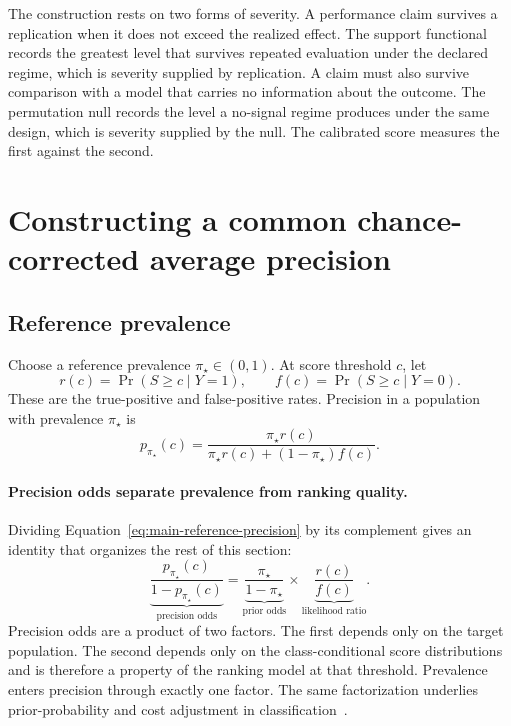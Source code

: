 \documentclass[11pt]{article}
\theoremstyle{remark}
\begin{document}
The construction rests on two forms of severity. A performance claim survives a replication when it does not exceed the realized effect. The support functional records the greatest level that survives repeated evaluation under the declared regime, which is severity supplied by replication. A claim must also survive comparison with a model that carries no information about the outcome. The permutation null records the level a no-signal regime produces under the same design, which is severity supplied by the null. The calibrated score measures the first against the second.

\section{Constructing a common chance-corrected average precision}

\subsection{Reference prevalence}

Choose a reference prevalence $\pi_\star\in(0,1)$. At score threshold $c$, let
\[
r(c)=\Pr(S\geq c\mid Y=1),
\qquad
f(c)=\Pr(S\geq c\mid Y=0).
\]
These are the true-positive and false-positive rates. Precision in a population with prevalence $\pi_\star$ is
\begin{equation}
 p_{\pi_\star}(c)
 =
 \frac{\pi_\star r(c)}
 {\pi_\star r(c)+(1-\pi_\star)f(c)}.
 \label{eq:main-reference-precision}
\end{equation}

\paragraph{Precision odds separate prevalence from ranking quality.}
Dividing Equation~\eqref{eq:main-reference-precision} by its complement gives an identity that organizes the rest of this section:
\begin{equation}
\underbrace{\frac{p_{\pi_\star}(c)}{1-p_{\pi_\star}(c)}}_{\text{precision odds}}
=
\underbrace{\frac{\pi_\star}{1-\pi_\star}}_{\text{prior odds}}
\times
\underbrace{\frac{r(c)}{f(c)}}_{\text{likelihood ratio}}.
\label{eq:odds}
\end{equation}
Precision odds are a product of two factors. The first depends only on the target population. The second depends only on the class-conditional score distributions and is therefore a property of the ranking model at that threshold. Prevalence enters precision through exactly one factor. The same factorization underlies prior-probability and cost adjustment in classification~\cite{elkan2001foundations}.
\end{document}
